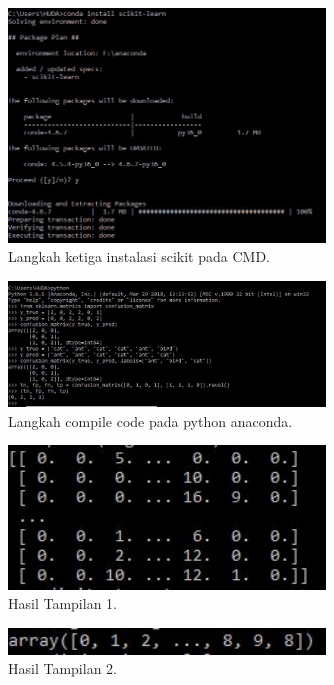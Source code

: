 \begin{figure}[ht]\centerline{\includegraphics[width=0.75\textwidth]{figures/huda/8.JPG}}\caption{Langkah ketiga instalasi scikit pada CMD.}\end{figure}
\begin{figure}[ht]\centerline{\includegraphics[width=0.75\textwidth]{figures/huda/9.JPG}}\caption{Langkah compile code pada python anaconda.}\end{figure}
\begin{figure}[ht]\centerline{\includegraphics[width=0.75\textwidth]{figures/huda/10.JPG}}\caption{Hasil Tampilan 1.}\end{figure}
\begin{figure}[ht]\centerline{\includegraphics[width=0.75\textwidth]{figures/huda/11.JPG}}\caption{Hasil Tampilan 2.}\end{figure}
